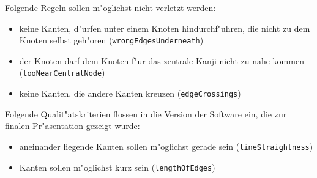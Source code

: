 Folgende Regeln sollen m"oglichst nicht verletzt werden:

\begin{itemize}
\item
  keine Kanten, d"urfen unter einem Knoten hindurchf"uhren, die nicht zu dem
  Knoten selbst geh"oren (\texttt{wrongEdgesUnderneath})
\item
  der Knoten darf dem Knoten f"ur das zentrale Kanji nicht zu nahe kommen
  (\texttt{tooNearCentralNode})
\item
  keine Kanten, die andere Kanten kreuzen (\texttt{edgeCrossings})
\end{itemize}

Folgende Qualit"atskriterien flossen in die Version der Software ein, die
zur finalen Pr"asentation gezeigt wurde:

\begin{itemize}
\item
  aneinander liegende Kanten sollen m"oglichst gerade sein
  (\texttt{lineStraightness})
\item
  Kanten sollen m"oglichst kurz sein (\texttt{lengthOfEdges})
\end{itemize}
